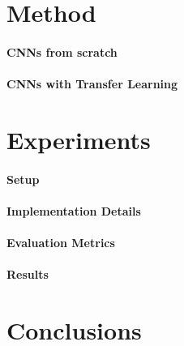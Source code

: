 \documentclass{article}
\begin{document}
\section{Method}\label{method}

\paragraph{CNNs from scratch}

\paragraph{CNNs with Transfer Learning}


\section{Experiments}\label{experiments}

\paragraph{Setup}

\paragraph{Implementation Details}

\paragraph{Evaluation Metrics}

\paragraph{Results}




\section{Conclusions}\label{conclusions}
\end{document}
